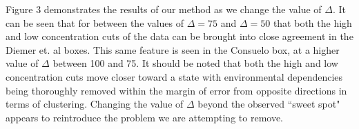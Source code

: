 \documentclass[usenatbib,usegraphicx,letterpaper]{mn2e}
\begin{document}
Figure 3 demonstrates the results of our method as we change the value of $\Delta$. It can be seen that for between the values of $\Delta = 75$ and $\Delta = 50$ that both the high and low concentration cuts of the data can be brought into close agreement in the Diemer et. al boxes. This same feature is seen in the Consuelo box, at a higher value of $\Delta$ between 100 and 75. It should be noted that both the high and low concentration cuts move closer toward a state with environmental dependencies being thoroughly removed within the margin of error from opposite directions in terms of clustering. Changing the value of $\Delta$ beyond the observed ``sweet spot" appears to reintroduce the problem we are attempting to remove.

\begin{figure}
	\centering
	\\

\end{figure}
\end{document}
